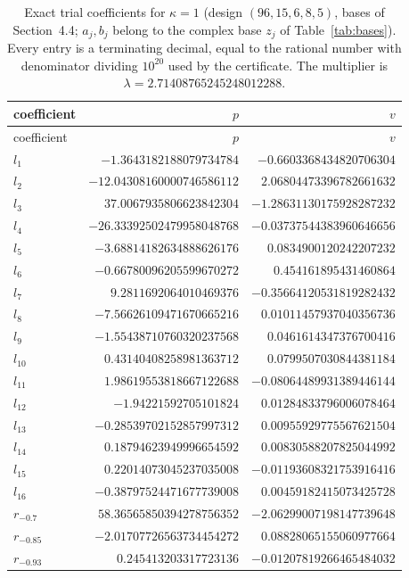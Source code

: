 \documentclass[11pt]{article}
\theoremstyle{definition}
\begin{document}
{\small
\begin{longtable}{lrr}
\caption{Exact trial coefficients for $\kappa=1$ (design $(96,15,6,8,5)$, bases of Section~4.4; $a_j,b_j$ belong to the complex base $z_j$ of Table~\ref{tab:bases}). Every entry is a terminating decimal, equal to the rational number with denominator dividing $10^{20}$ used by the certificate. The multiplier is $\lambda=2.71408765245248012288$.}\label{tab:coef1}\\
\toprule coefficient & $p$ & $v$\\\midrule\endfirsthead
\toprule coefficient & $p$ & $v$\\\midrule\endhead
$l_{1}$ & $-1.3643182188079734784$ & $-0.6603368434820706304$\\
$l_{2}$ & $-12.04308160000746586112$ & $2.06804473396782661632$\\
$l_{3}$ & $37.0067935806623842304$ & $-1.28631130175928287232$\\
$l_{4}$ & $-26.33392502479958048768$ & $-0.03737544383960646656$\\
$l_{5}$ & $-3.68814182634888626176$ & $0.0834900120242207232$\\
$l_{6}$ & $-0.66780096205599670272$ & $0.454161895431460864$\\
$l_{7}$ & $9.2811692064010469376$ & $-0.35664120531819282432$\\
$l_{8}$ & $-7.56626109471670665216$ & $0.01011457937040356736$\\
$l_{9}$ & $-1.55438710760320237568$ & $0.0461614347376700416$\\
$l_{10}$ & $0.43140408258981363712$ & $0.0799507030844381184$\\
$l_{11}$ & $1.98619553818667122688$ & $-0.08064489931389446144$\\
$l_{12}$ & $-1.94221592705101824$ & $0.01284833796006078464$\\
$l_{13}$ & $-0.28539702152857997312$ & $0.00955929775567621504$\\
$l_{14}$ & $0.18794623949996654592$ & $0.00830588207825044992$\\
$l_{15}$ & $0.22014073045237035008$ & $-0.01193608321753916416$\\
$l_{16}$ & $-0.38797524471677739008$ & $0.00459182415073425728$\\
$r_{-0.7}$ & $58.36565850394278756352$ & $-2.06299007198147739648$\\
$r_{-0.85}$ & $-2.01707726563734454272$ & $0.08828065155060977664$\\
$r_{-0.93}$ & $0.245413203317723136$ & $-0.01207819266465484032$\\

\end{longtable}}
\end{document}
